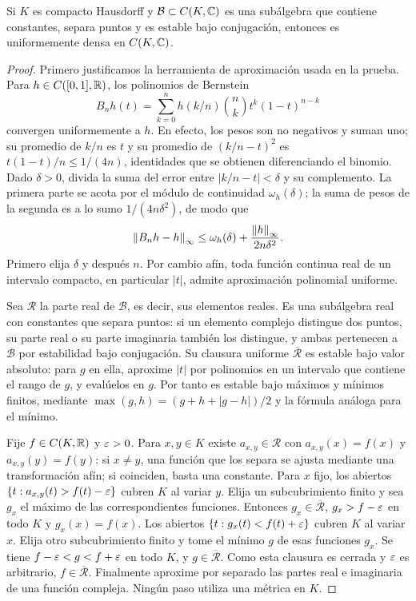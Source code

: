 \begin{lema}\label{v3:stone-weierstrass}
Si $K$ es compacto Hausdorff y $\mathcal B\subset C(K,\mathbb C)$ es una subálgebra que contiene constantes, separa puntos y es estable bajo conjugación, entonces es uniformemente densa en $C(K,\mathbb C)$.
\end{lema}
\begin{proof}
Primero justificamos la herramienta de aproximación usada en la prueba. Para $h\in C([0,1],\mathbb R)$, los polinomios de Bernstein
\[
 B_nh(t)=\sum_{k=0}^nh(k/n)\binom nk t^k(1-t)^{n-k}
\]
convergen uniformemente a $h$. En efecto, los pesos son no negativos y suman uno; su promedio de $k/n$ es $t$ y su promedio de $(k/n-t)^2$ es $t(1-t)/n\le1/(4n)$, identidades que se obtienen diferenciando el binomio. Dado $\delta>0$, divida la suma del error entre $|k/n-t|<\delta$ y su complemento. La primera parte se acota por el módulo de continuidad $\omega_h(\delta)$; la suma de pesos de la segunda es a lo sumo $1/(4n\delta^2)$, de modo que
\[
 \left\lVert B_nh-h\right\rVert_\infty\le\omega_h(\delta)+\frac{\left\lVert h\right\rVert_\infty}{2n\delta^2}.
\]
Primero elija $\delta$ y después $n$. Por cambio afín, toda función continua real de un intervalo compacto, en particular $|t|$, admite aproximación polinomial uniforme.

Sea $\mathcal R$ la parte real de $\mathcal B$, es decir, sus elementos reales. Es una subálgebra real con constantes que separa puntos: si un elemento complejo distingue dos puntos, su parte real o su parte imaginaria también los distingue, y ambas pertenecen a $\mathcal B$ por estabilidad bajo conjugación. Su clausura uniforme $\overline{\mathcal R}$ es estable bajo valor absoluto: para $g$ en ella, aproxime $|t|$ por polinomios en un intervalo que contiene el rango de $g$, y evalúelos en $g$. Por tanto es estable bajo máximos y mínimos finitos, mediante $\max(g,h)=(g+h+|g-h|)/2$ y la fórmula análoga para el mínimo.

Fije $f\in C(K,\mathbb R)$ y $\varepsilon>0$. Para $x,y\in K$ existe $a_{x,y}\in\mathcal R$ con $a_{x,y}(x)=f(x)$ y $a_{x,y}(y)=f(y)$: si $x\ne y$, una función que los separa se ajusta mediante una transformación afín; si coinciden, basta una constante. Para $x$ fijo, los abiertos $\{t:a_{x,y}(t)>f(t)-\varepsilon\}$ cubren $K$ al variar $y$. Elija un subcubrimiento finito y sea $g_x$ el máximo de las correspondientes funciones. Entonces $g_x\in\overline{\mathcal R}$, $g_x>f-\varepsilon$ en todo $K$ y $g_x(x)=f(x)$. Los abiertos $\{t:g_x(t)<f(t)+\varepsilon\}$ cubren $K$ al variar $x$. Elija otro subcubrimiento finito y tome el mínimo $g$ de esas funciones $g_x$. Se tiene $f-\varepsilon<g<f+\varepsilon$ en todo $K$, y $g\in\overline{\mathcal R}$. Como esta clausura es cerrada y $\varepsilon$ es arbitrario, $f\in\overline{\mathcal R}$. Finalmente aproxime por separado las partes real e imaginaria de una función compleja. Ningún paso utiliza una métrica en $K$.
\end{proof}

